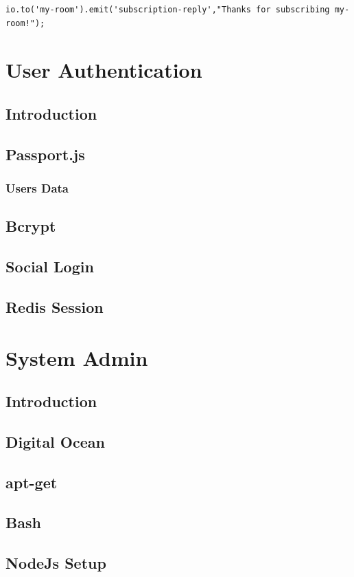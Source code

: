 \documentclass[a4paper]{article}
\begin{document}
\begin{lstlisting}
io.to('my-room').emit('subscription-reply',"Thanks for subscribing my-room!");
\end{lstlisting}


\section{User Authentication}
\subsection{Introduction}
\subsection{Passport.js}
\subsubsection{Users Data}

\subsection{Bcrypt}
\subsection{Social Login}
\subsection{Redis Session}

\section{System Admin}
\subsection{Introduction}
\subsection{Digital Ocean}
\subsection{apt-get}
\subsection{Bash}
\subsection{NodeJs Setup}
\end{document}
